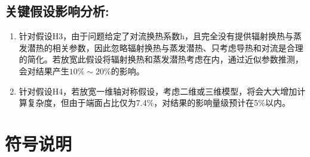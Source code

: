 \documentclass[12pt,a4paper]{article}
\begin{document}
\subsection*{关键假设影响分析:}

\begin{enumerate}
       \item 针对假设H3，由于问题给定了对流换热系数h，且完全没有提供辐射换热与蒸发潜热的相关参数，因此忽略辐射换热与蒸发潜热、只考虑导热和对流是合理的简化。若放宽此假设将辐射换热和蒸发潜热考虑在内，通过近似参数推测，会对结果产生$10\% \sim 20\%$的影响。
       \item 针对假设H4，若放宽一维轴对称假设，考虑二维或三维模型，将会大大增加计算复杂度，但由于端面占比仅为7.4\%，对结果的影响量级预计在5\%以内。
\end{enumerate}


\section{符号说明}
\end{document}
